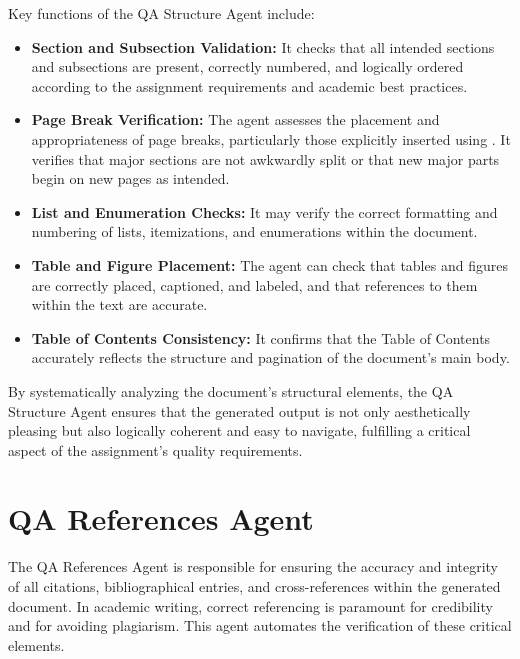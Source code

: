 \documentclass{custom-academic-template}
\begin{document}
Key functions of the QA Structure Agent include:
\begin{itemize}
    \item 	\textbf{Section and Subsection Validation:} It checks that all intended sections and subsections are present, correctly numbered, and logically ordered according to the assignment requirements and academic best practices.
    \item 	\textbf{Page Break Verification:} The agent assesses the placement and appropriateness of page breaks, particularly those explicitly inserted using 	\texttt{\newpage}. It verifies that major sections are not awkwardly split or that new major parts begin on new pages as intended.
    \item 	\textbf{List and Enumeration Checks:} It may verify the correct formatting and numbering of lists, itemizations, and enumerations within the document.
    \item 	\textbf{Table and Figure Placement:} The agent can check that tables and figures are correctly placed, captioned, and labeled, and that references to them within the text are accurate.
    \item 	\textbf{Table of Contents Consistency:} It confirms that the Table of Contents accurately reflects the structure and pagination of the document's main body.
\end{itemize}
By systematically analyzing the document's structural elements, the QA Structure Agent ensures that the generated output is not only aesthetically pleasing but also logically coherent and easy to navigate, fulfilling a critical aspect of the assignment's quality requirements.

\section{QA References Agent}
The QA References Agent is responsible for ensuring the accuracy and integrity of all citations, bibliographical entries, and cross-references within the generated document. In academic writing, correct referencing is paramount for credibility and for avoiding plagiarism. This agent automates the verification of these critical elements.
\end{document}
